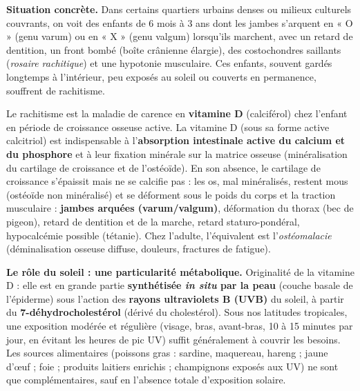 \documentclass[11pt]{article}
\newcommand{\cle}[1]{{\popxbold\color{popdark}#1}}
\newcounter{popsec}
\newcounter{popsub}
\newcommand{\courssub}[1]{%
  \stepcounter{popsub}%
  \par\vspace{9pt}\noindent{\popxbold\fontsize{11.5}{13}\selectfont\color{popink}{\color{poporange}\thepopsec.\thepopsub}\hspace{6pt}#1}\par\nopagebreak\vspace{4pt}
}
\begin{document}
\courssub{La carence en vitamine D : le rachitisme}

\textbf{Situation concrète.} Dans certains quartiers urbains denses ou milieux culturels couvrants, on voit des enfants de 6 mois à 3 ans dont les jambes s'arquent en « O » (genu varum) ou en « X » (genu valgum) lorsqu'ils marchent, avec un retard de dentition, un front bombé (boîte crânienne élargie), des costochondres saillants (\emph{rosaire rachitique}) et une hypotonie musculaire. Ces enfants, souvent gardés longtemps à l'intérieur, peu exposés au soleil ou couverts en permanence, souffrent de \cle{rachitisme}.

\begin{definition}[Rachitisme]
Le \cle{rachitisme} est la maladie de carence en \textbf{vitamine D} (calciférol) chez l'enfant en période de croissance osseuse active. La vitamine D (sous sa forme active calcitriol) est indispensable à l'\textbf{absorption intestinale active du calcium et du phosphore} et à leur fixation minérale sur la matrice osseuse (minéralisation du cartilage de croissance et de l'ostéoïde). En son absence, le cartilage de croissance s'épaissit mais ne se calcifie pas : les os, mal minéralisés, restent mous (ostéoïde non minéralisé) et se déforment sous le poids du corps et la traction musculaire : \textbf{jambes arquées (varum/valgum)}, déformation du thorax (bec de pigeon), retard de dentition et de la marche, retard staturo-pondéral, hypocalcémie possible (tétanie). Chez l'adulte, l'équivalent est l'\emph{ostéomalacie} (déminalisation osseuse diffuse, douleurs, fractures de fatigue).
\end{definition}

\textbf{Le rôle du soleil : une particularité métabolique.} Originalité de la vitamine D : elle est en grande partie \textbf{synthétisée \emph{in situ} par la peau} (couche basale de l'épiderme) sous l'action des \textbf{rayons ultraviolets B (UVB)} du soleil, à partir du \textbf{7-déhydrocholestérol} (dérivé du cholestérol). Sous nos latitudes tropicales, une exposition modérée et régulière (visage, bras, avant-bras, 10 à 15 minutes par jour, en évitant les heures de pic UV) suffit généralement à couvrir les besoins. Les sources alimentaires (poissons gras : sardine, maquereau, hareng ; jaune d'œuf ; foie ; produits laitiers enrichis ; champignons exposés aux UV) ne sont que complémentaires, sauf en l'absence totale d'exposition solaire.
\end{document}
